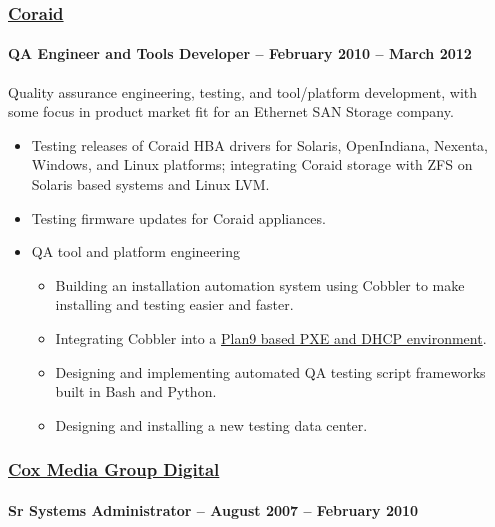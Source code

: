 \documentclass[fontsize=11pt]{scrartcl}
\begin{document}
  \subsubsection{\href{http://www.coraid.com/}{Coraid}}\label{coraid}

  \paragraph{QA Engineer and Tools Developer -- February 2010 -- March
    2012}\label{qa-engineer-and-tools-developer-february-2010-march-2012}

  Quality assurance engineering, testing, and tool/platform development,
  with some focus in product market fit for an Ethernet SAN Storage
  company.

  \begin{itemize}
    \item
      Testing releases of Coraid HBA drivers for Solaris, OpenIndiana,
      Nexenta, Windows, and Linux platforms; integrating Coraid storage with
      ZFS on Solaris based systems and Linux LVM.
    \item
      Testing firmware updates for Coraid appliances.
    \item
      QA tool and platform engineering

      \begin{itemize}
        \item
          Building an installation automation system using Cobbler to make
          installing and testing easier and faster.
        \item
          Integrating Cobbler into a
          \href{http://blog.friocorte.com/2011/05/chain-loading-pxe-servers.html}{Plan9
            based PXE and DHCP environment}.
        \item
          Designing and implementing automated QA testing script frameworks
          built in Bash and Python.
        \item
          Designing and installing a new testing data center.
      \end{itemize}
  \end{itemize}

  \subsubsection{\href{http://cmgdigital.com/}{Cox Media Group
      Digital}}\label{cox-media-group-digital}

  \paragraph{Sr Systems Administrator -- August 2007 -- February
    2010}\label{sr-systems-administrator-august-2007-february-2010}
\end{document}
